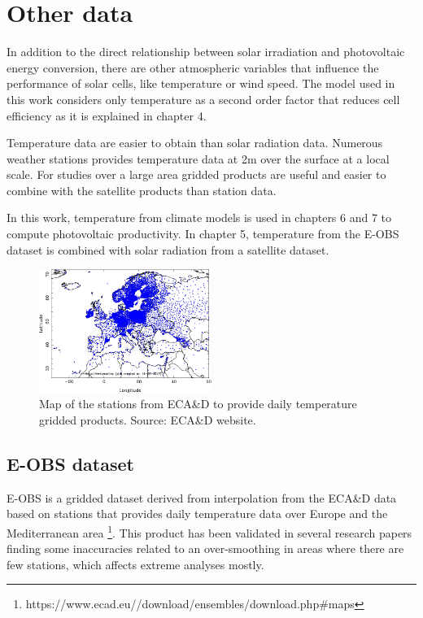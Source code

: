 \section{Other data}%

  In addition to the direct relationship between solar irradiation and photovoltaic energy conversion, there are other atmospheric variables that influence the performance of solar cells, like temperature or wind speed. The model used in this work considers only temperature as a second order factor that reduces cell efficiency as it is explained in chapter 4.
 
  Temperature data are easier to obtain than solar radiation data. Numerous weather stations provides temperature data at 2m over the surface at a local scale. For studies over a large area gridded products are useful and easier to combine with the satellite products than station data.

  In this work, temperature from climate models is used in chapters 6 and 7 to compute photovoltaic productivity. In chapter 5, temperature from the E-OBS dataset is combined with solar radiation from a satellite dataset.

  
\begin{figure}[h]
\centering
\includegraphics[width=0.5\textwidth]{figs/all_stations_plot.png}
\caption[Map of ECA&D stations]{Map of the stations from ECA\&D to provide daily temperature gridded products. Source: ECA\&D website.}
\label{fig:ecad}
\end{figure}

\subsection{E-OBS dataset}
  
  E-OBS is a gridded dataset derived from interpolation from the ECA\&D data based on stations that provides daily temperature data over Europe and the Mediterranean area \footnote{https://www.ecad.eu//download/ensembles/download.php#maps}. This product has been validated in several research papers \cite*{Begert2008, Hofstra2009} finding some inaccuracies related to an over-smoothing in areas where there are few stations, which affects extreme analyses mostly.

